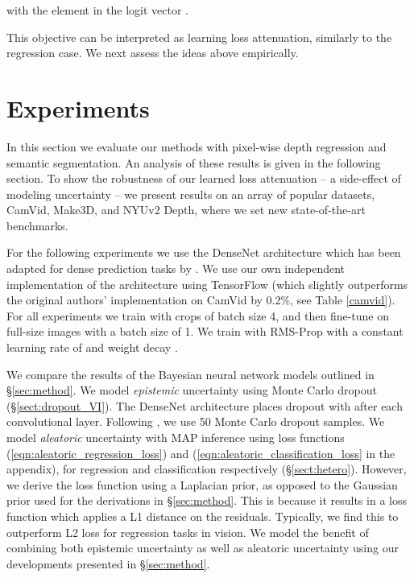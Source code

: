 \documentclass{article}
\begin{document}
with  the  element in the logit vector . 

This objective can be interpreted as learning loss attenuation, similarly to the regression case. We next assess the ideas above empirically.














\section{Experiments}
\label{sec:results}

In this section we evaluate our methods with pixel-wise depth regression and semantic segmentation. An analysis of these results is given in the following section. To show the robustness of our learned loss attenuation -- a side-effect of modeling uncertainty -- we present results on an array of popular datasets, CamVid, Make3D, and NYUv2 Depth, where we set new state-of-the-art benchmarks.


For the following experiments we use the DenseNet architecture \cite{huang2016densely} which has been adapted for dense prediction tasks by \cite{jegou2016one}. We use our own independent implementation of the architecture using TensorFlow \cite{abadi2016tensorflow} (which slightly outperforms the original authors' implementation on CamVid by 0.2\%, see Table \ref{camvid}). For all experiments we train with  crops of batch size 4, and then fine-tune on full-size images with a batch size of 1. We train with RMS-Prop with a constant learning rate of  and weight decay .



We compare the results of the Bayesian neural network models outlined in \S\ref{sec:method}. We model \textit{epistemic} uncertainty using Monte Carlo dropout (\S\ref{sect:dropout_VI}). The DenseNet architecture places dropout with  after each convolutional layer. Following \cite{kendall2015bayesian}, we use 50 Monte Carlo dropout samples. We model \textit{aleatoric} uncertainty with MAP inference using loss functions (\ref{eqn:aleatoric_regression_loss}) and (\ref{eqn:aleatoric_classification_loss} in the appendix), for regression and classification respectively (\S\ref{sect:hetero}).
However, we derive the loss function using a Laplacian prior, as opposed to the Gaussian prior used for the derivations in \S\ref{sec:method}. This is because it results in a loss function which applies a L1 distance on the residuals. Typically, we find this to outperform L2 loss for regression tasks in vision.
We model the benefit of combining both epistemic uncertainty as well as aleatoric uncertainty using our developments presented in \S\ref{sec:method}. 
\end{document}
